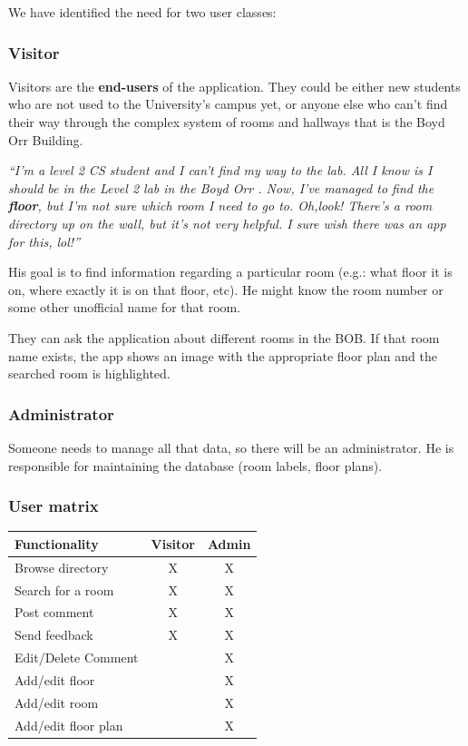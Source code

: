 \documentclass{sig-alt-release2}
\begin{document}
We have identified the need for two user classes:

\subsubsection*{Visitor}
Visitors are the \textbf{end-users} of the application. They could be either
new students who are not used to the University's campus yet, or anyone else
who can't find their way through the complex system of rooms and hallways that
is the Boyd Orr Building.

\emph{``I'm a level 2 CS student and I can't find my way to the lab. All 
I know is I should be in the \guillemotleft Level 2 lab in the Boyd Orr
\guillemotright. Now, I've managed to find the \textbf{floor}, but I'm not sure
which room I need to go to. Oh,look! There's a room directory up on the wall, 
but it's not very helpful. I sure wish there was an app for this, lol!''}

His goal is to find information regarding a particular room (e.g.: what floor 
it is on, where exactly it is on that floor, etc). He might know the room 
number or some other unofficial name for that room.

They can ask the application about different rooms in the BOB. If that room 
name exists, the app shows an image with the appropriate floor plan and the 
searched room is highlighted.

\subsubsection*{Administrator}
Someone needs to manage all that data, so there will be an administrator. He is
responsible for maintaining the database (room labels, floor plans).

\subsubsection*{User matrix}

\begin{tabular}{| p{4cm} | c | c |} \hline
\textbf{Functionality} & \textbf{Visitor} & \textbf{Admin} \\ \hline
Browse directory & X & X \\ \hline
Search for a room & X & X \\ \hline
Post comment & X & X \\ \hline
Send feedback & X & X \\ \hline
Edit/Delete Comment & & X \\ \hline
Add/edit floor &  & X \\ \hline
Add/edit room & & X \\ \hline
Add/edit floor plan & & X \\ \hline
\end{tabular}	
\end{document}
